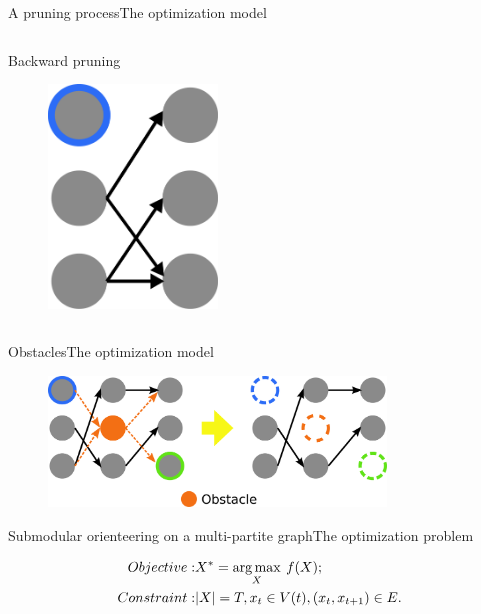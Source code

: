 \begin{frame}{A pruning process}{The optimization model}
\begin{columns}
\begin{block}{Backward pruning}
\begin{figure}
\centering
\includegraphics[width = 0.4\textwidth]{./figure/backward_prune}
\end{figure}

\end{block}

\end{columns}

\end{frame}

\begin{frame}{Obstacles}{The optimization model}

\begin{figure}
\centering
\includegraphics[width = 0.8\textwidth]{./figure/obstacle}
\end{figure}

\end{frame}

\begin{frame}{Submodular orienteering on a multi-partite graph}{The optimization problem}

\begin{equation}
\nonumber
\begin{aligned}
Objective: & X^{*} = \operatorname*{arg\,max}_{X} \: f(X); \\
Constraint: & |X| = T, x_{t} \in V(t), (x_{t}, x_{t+1}) \in E.
\end{aligned}
\end{equation}

\end{frame}